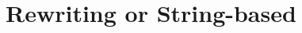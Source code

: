 \begin{center}
\begin{longtable}
						
						
						
						
						
						
				\bottomrule
				\caption{Previous Work on Open-Ended Evolution in Artificial Evolution\label{tbl:previousworkcreativity}}
			\end{longtable}
		\end{center}
		
		\hypertarget{rewriting-or-string-based}{\section{Rewriting or
				String-based}\label{rewriting-or-string-based}}
		
